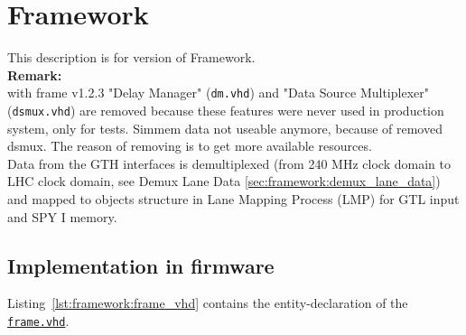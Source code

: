 \section{Framework}\label{sec:framework:framework}

This description is for version \versionframe of Framework.\\

\textbf{Remark:}\\
with frame v1.2.3 "Delay Manager" (\texttt{dm.vhd}) and "Data Source Multiplexer" (\texttt{dsmux.vhd}) are removed because these features were never used in production system, only for tests.
Simmem data not useable anymore, because of removed dsmux.
The reason of removing is to get more available resources.\\

Data from the GTH interfaces is demultiplexed (from 240 MHz clock domain to LHC clock domain, see Demux Lane Data \ref{sec:framework:demux_lane_data}) and mapped to objects structure in Lane Mapping Process (LMP) for GTL input and SPY I memory.

\subsection{Implementation in firmware}
\label{sec:framework:implementation_firmware}

Listing~\ref{lst:framework:frame_vhd} contains the entity-declaration of the \href{https://github.com/cms-l1-globaltrigger/mp7_ugt_legacy/blob/master/firmware/hdl/payload/frame.vhd}{\texttt{frame.vhd}}.\\



\clearpage

